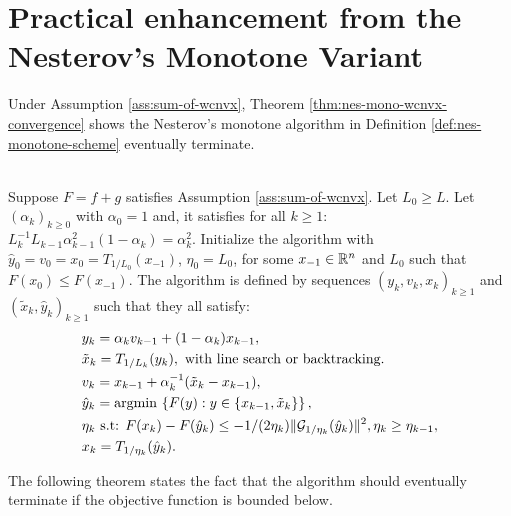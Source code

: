 \documentclass[12pt]{report}
\begin{document}
    \section{Practical enhancement from the Nesterov's Monotone Variant}
        Under Assumption \ref{ass:sum-of-wcnvx}, Theorem \ref{thm:nes-mono-wcnvx-convergence} shows the Nesterov's monotone algorithm in Definition \ref{def:nes-monotone-scheme} eventually terminate. 
        \begin{definition}\;\label{def:nes-monotone-scheme}\\
            Suppose $F = f + g$ satisfies Assumption \ref{ass:sum-of-wcnvx}. 
            Let $L_0 \ge L$. 
            Let $(\alpha_k)_{k \ge 0}$ with $\alpha_0 = 1$ and, it satisfies for all $k \ge 1$: $L_{k}^{-1}L_{k - 1}\alpha_{k - 1}^2(1 - \alpha_k) = \alpha_k^2$. 
            Initialize the algorithm with $\hat y_0 =v_0=x_0 = T_{1/L_0}(x_{-1})$, $\eta_0 = L_0$, for some $x_{-1} \in \mathbb R^n$ and $L_0$ such that $F(x_0) \le F(x_{-1})$. 
            The algorithm is defined by sequences $(y_k, v_k, x_k)_{k \ge 1}$ and $(\tilde x_k, \hat y_k)_{k \ge 1}$ such that they all satisfy: 
            $$
            \begin{aligned}
                &y_k = \alpha_k v_{k - 1} + (1 - \alpha_k)x_{k - 1},
                \\
                &\tilde x_k = T_{1/L_k}(y_k), \text{ with line search or backtracking. }
                \\
                &v_k = x_{k - 1} + \alpha_k^{-1}(\tilde x_k - x_{k - 1}),
                \\
                &\hat y_k = \mathop{\rm argmin}\limits{}\left\lbrace
                    F(y): y \in \{x_{k - 1}, \tilde x_k\}
                \right\rbrace,
                \\
                & \eta_{k}\text{ s.t: } F(x_k) - F(\hat y_k) \le - 1/(2\eta_k)\Vert \mathcal G_{1/\eta_k}(\hat y_k) \Vert^2, \eta_{k} \ge \eta_{k - 1}, 
                \\
                &x_k = T_{1/\eta_k}(\hat y_k) . 
            \end{aligned}
            $$
        \end{definition}
        The following theorem states the fact that the algorithm should eventually terminate if the objective function is bounded below. 
\end{document}
